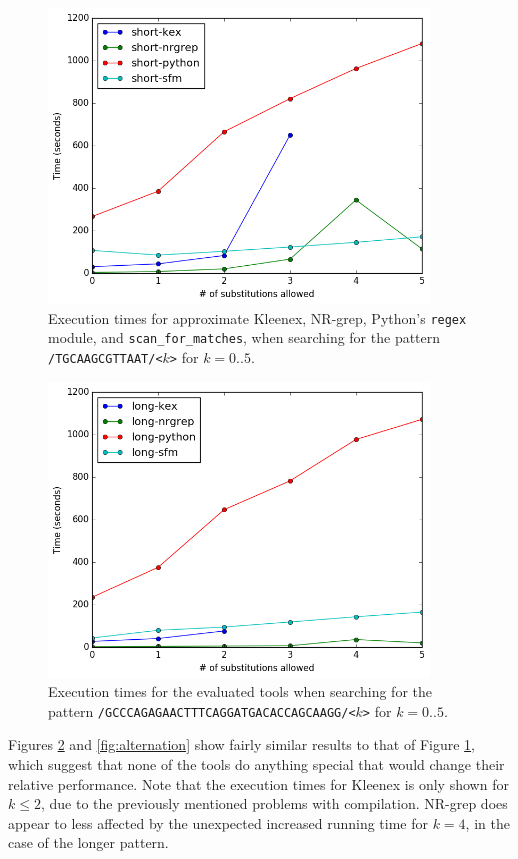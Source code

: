 \begin{figure}[!hb]
  \centering
  \includegraphics[width=0.9\textwidth]{images/short.png}
  \caption{Execution times for approximate Kleenex, NR-grep, Python's
    \texttt{regex} module, and \texttt{scan\_for\_matches}, when searching for
    the pattern \texttt{/TGCAAGCGTTAAT/<$k$>} for $k=0..5$.}
  \label{fig:short}
\end{figure}

\begin{figure}[!hb]
  \centering
  \includegraphics[width=0.9\textwidth]{images/long.png}
  \caption{Execution times for the evaluated tools when searching for the
    pattern \texttt{/GCCCAGAGAACTTTCAGGATGACACCAGCAAGG/<$k$>} for $k=0..5$.}
  \label{fig:long}
\end{figure}

Figures \ref{fig:long} and \ref{fig:alternation} show fairly similar results to
that of Figure \ref{fig:short}, which suggest that none of the tools do
anything special that would change their relative performance. Note that the
execution times for Kleenex is only shown for $k\leq2$, due to the previously
mentioned problems with compilation. NR-grep does appear to less affected by
the unexpected increased running time for $k=4$, in the case of the longer
pattern.

